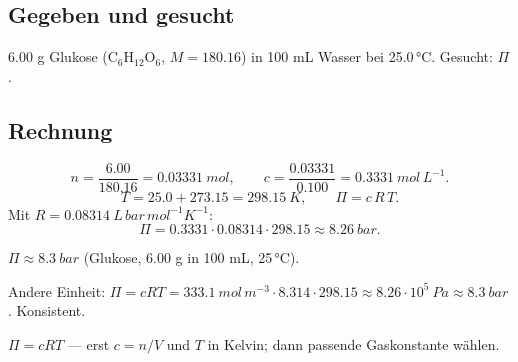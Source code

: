 
\subsection*{Gegeben und gesucht}
6.00 g Glukose (C$_6$H$_{12}$O$_6$, $M=180.16$) in 100 mL Wasser bei
25.0\,°C. Gesucht: $\Pi$.

\subsection*{Rechnung}
\[
  n = \frac{6.00}{180.16} = 0.03331\ mol,\qquad
  c = \frac{0.03331}{0.100} = 0.3331\ mol\,L^{-1}.
\]
\[
  T = 25.0 + 273.15 = 298.15\ K,\qquad
  \Pi = c\,R\,T.
\]
Mit $R = 0.08314\ L\,bar\,mol^{-1}K^{-1}$:
\[
  \Pi = 0.3331\cdot0.08314\cdot298.15 \approx 8.26\ bar .
\]

\begin{ergebnis}
$\Pi \approx 8.3\ bar$ (Glukose, 6.00 g in 100 mL, 25\,°C).
\end{ergebnis}

\begin{kontrolle}
Andere Einheit: $\Pi=cRT
=333.1\ mol\,m^{-3}\cdot8.314\cdot298.15 \approx 8.26\cdot10^5\ Pa
\approx 8.3\ bar$. Konsistent.
\end{kontrolle}

\begin{merksatz}
$\Pi = cRT$ --- erst $c=n/V$ und $T$ in Kelvin; dann passende
Gaskonstante wählen.
\end{merksatz}
